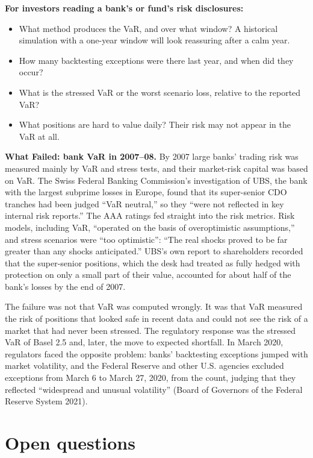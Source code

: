 \textbf{For investors reading a bank's or fund's risk disclosures:}

\begin{itemize}
  \item What method produces the VaR, and over what window? A historical simulation with a one-year window will look reassuring after a calm year.
  \item How many backtesting exceptions were there last year, and when did they occur?
  \item What is the stressed VaR or the worst scenario loss, relative to the reported VaR?
  \item What positions are hard to value daily? Their risk may not appear in the VaR at all.
\end{itemize}

\begin{callout}
\textbf{What Failed: bank VaR in 2007--08.} By 2007 large banks' trading risk was measured mainly by VaR and stress tests, and their market-risk capital was based on VaR. The Swiss Federal Banking Commission's investigation of UBS, the bank with the largest subprime losses in Europe, found that its super-senior CDO tranches had been judged ``VaR neutral,'' so they ``were not reflected in key internal risk reports.'' The AAA ratings fed straight into the risk metrics. Risk models, including VaR, ``operated on the basis of overoptimistic assumptions,'' and stress scenarios were ``too optimistic'': ``The real shocks proved to be far greater than any shocks anticipated.'' UBS's own report to shareholders recorded that the super-senior positions, which the desk had treated as fully hedged with protection on only a small part of their value, accounted for about half of the bank's losses by the end of 2007.

The failure was not that VaR was computed wrongly. It was that VaR measured the risk of positions that looked safe in recent data and could not see the risk of a market that had never been stressed. The regulatory response was the stressed VaR of Basel 2.5 and, later, the move to expected shortfall. In March 2020, regulators faced the opposite problem: banks' backtesting exceptions jumped with market volatility, and the Federal Reserve and other U.S. agencies excluded exceptions from March 6 to March 27, 2020, from the count, judging that they reflected ``widespread and unusual volatility'' (Board of Governors of the Federal Reserve System 2021).
\end{callout}

\section{Open questions}
\label{sec:13-open}


